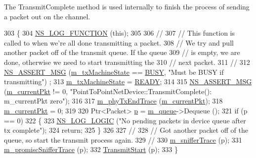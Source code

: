 The Transmit\+Complete method is used internally to finish the process of sending a packet out on the channel. 
\begin{DoxyCode}
303 \{
304   \hyperlink{log-macros-disabled_8h_a90b90d5bad1f39cb1b64923ea94c0761}{NS\_LOG\_FUNCTION} (\textcolor{keyword}{this});
305 
306   \textcolor{comment}{//}
307   \textcolor{comment}{// This function is called to when we're all done transmitting a packet.}
308   \textcolor{comment}{// We try and pull another packet off of the transmit queue.  If the queue}
309   \textcolor{comment}{// is empty, we are done, otherwise we need to start transmitting the}
310   \textcolor{comment}{// next packet.}
311   \textcolor{comment}{//}
312   \hyperlink{assert_8h_aff5ece9066c74e681e74999856f08539}{NS\_ASSERT\_MSG} (\hyperlink{classns3_1_1PointToPointNetDevice_ad5896856f00b39aa0cc090f2e1a1e184}{m\_txMachineState} == \hyperlink{classns3_1_1PointToPointNetDevice_a963e2da767f0ac1b49a74eeb7b63e417ad6dad80bbdc386db39a8ea87e70a0250}{BUSY}, \textcolor{stringliteral}{"Must be BUSY if transmitting"})
      ;
313   \hyperlink{classns3_1_1PointToPointNetDevice_ad5896856f00b39aa0cc090f2e1a1e184}{m\_txMachineState} = \hyperlink{classns3_1_1PointToPointNetDevice_a963e2da767f0ac1b49a74eeb7b63e417a462ad9faf8cb8b62bc498f336befcb6a}{READY};
314 
315   \hyperlink{assert_8h_aff5ece9066c74e681e74999856f08539}{NS\_ASSERT\_MSG} (\hyperlink{classns3_1_1PointToPointNetDevice_abfddd3ae8f730f2f81360d926d40a78b}{m\_currentPkt} != 0, \textcolor{stringliteral}{"PointToPointNetDevice::TransmitComplete():
       m\_currentPkt zero"});
316 
317   \hyperlink{classns3_1_1PointToPointNetDevice_ad24afff2bade80cd2e2b952117f3945a}{m\_phyTxEndTrace} (\hyperlink{classns3_1_1PointToPointNetDevice_abfddd3ae8f730f2f81360d926d40a78b}{m\_currentPkt});
318   \hyperlink{classns3_1_1PointToPointNetDevice_abfddd3ae8f730f2f81360d926d40a78b}{m\_currentPkt} = 0;
319 
320   Ptr<Packet> \hyperlink{lte__link__budget_8m_ac9de518908a968428863f829398a4e62}{p} = \hyperlink{classns3_1_1PointToPointNetDevice_accb023eb99ce542c5a33bb5e79b7c2eb}{m\_queue}->Dequeue ();
321   \textcolor{keywordflow}{if} (p == 0)
322     \{
323       \hyperlink{group__logging_ga88acd260151caf2db9c0fc84997f45ce}{NS\_LOG\_LOGIC} (\textcolor{stringliteral}{"No pending packets in device queue after tx complete"});
324       \textcolor{keywordflow}{return};
325     \}
326 
327   \textcolor{comment}{//}
328   \textcolor{comment}{// Got another packet off of the queue, so start the transmit process again.}
329   \textcolor{comment}{//}
330   \hyperlink{classns3_1_1PointToPointNetDevice_ae62def3355a42b37b41f7d59dc81bb0e}{m\_snifferTrace} (p);
331   \hyperlink{classns3_1_1PointToPointNetDevice_ad1f77c2c8a3e70210dfd89f0d4b670de}{m\_promiscSnifferTrace} (p);
332   \hyperlink{classns3_1_1PointToPointNetDevice_a1ad9539543bb82303ce7ad8bcafe66e3}{TransmitStart} (p);
333 \}
\end{DoxyCode}


